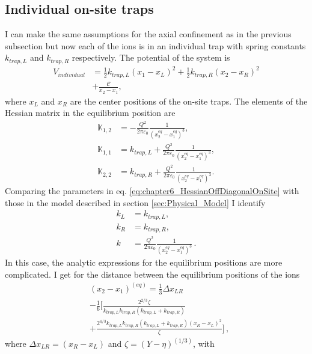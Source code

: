 \subsection{Individual on-site traps}
%
%
%
I can make the same assumptions for the axial confinement as in the previous subsection but now each of the ions is in an individual trap with spring constants $k_{trap,L}$ and $k_{trap,R}$ respectively. The potential of the system is
%
\begin{align}
    V_{individual} &= \frac{1}{2}k_{trap,L}\left(x_1 -x_L\right)^2 +\frac{1}{2}k_{trap, R}\left(x_2 -x_R\right)^2 \nonumber \\&+ \frac{\mathcal{C}}{x_2-x_1},
\end{align}
%
where $x_L$ and $x_R$ are the center positions of the on-site traps. The elements of the Hessian matrix in the equilibrium position are
%
\begin{align}
  \mathbb{K}_{1,2} &= -\frac{Q^2}{2\pi\varepsilon_0}\frac{1}{(x_2^{eq}-x_1^{eq})^3},\nonumber
  \\
  \mathbb{K}_{1,1} &= k_{trap,L} + \frac{Q^2}{2\pi\varepsilon_0}\frac{1}{(x_2^{eq}-x_1^{eq})^3},\nonumber
  \\
  \mathbb{K}_{2,2} &= k_{trap,R} + \frac{Q^2}{2\pi\varepsilon_0}\frac{1}{(x_2^{eq}-x_1^{eq})^3}.
  \label{eq:chapter6_HessianOffDiagonalOnSite}
\end{align}
%
Comparing the parameters in eq. \eqref{eq:chapter6_HessianOffDiagonalOnSite} with those in the model described in section \ref{sec:Physical_Model} I identify
\begin{align}
  k_L &= k_{trap,L},\nonumber\\
  k_R &= k_{trap,R},\nonumber\\
  k &= \frac{Q^2}{2\pi\varepsilon_0}\frac{1}{(x_2^{eq}-x_1^{eq})^3}\,.
\end{align}
%
In this case, the analytic expressions for the equilibrium positions are more complicated. I get for the distance between the equilibrium positions of the ions
%
\begin{align}
  &(x_2 - x_1)^{(eq)} = \frac{1}{3} \Delta x_{LR}\nonumber\\
  &- \frac{1}{6}\Big[ \frac{2^{2/3}\zeta}{k_{trap,L} k_{trap,R} (k_{trap,L} + k_{trap,R})}\nonumber\\
  &+ \frac{2^{4/3} k_{trap,L} k_{trap,R} (k_{trap,L} + k_{trap,R}) (x_R-x_L)^2}{\zeta} \Big]\,,
\end{align}
%
where $\Delta x_{LR} = (x_R-x_L)$ and $\zeta = \left( Y - \eta \right)^{(1/3)}$, with
